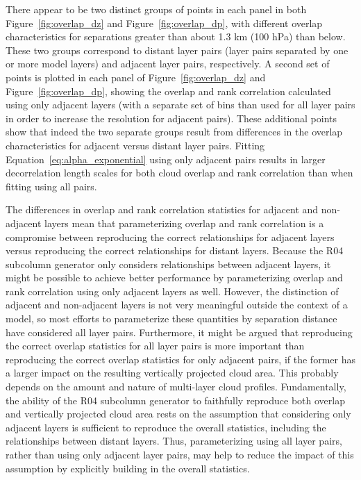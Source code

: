There appear to be two distinct groups of points in each panel in both
Figure~\ref{fig:overlap_dz} and Figure~\ref{fig:overlap_dp}, with
different overlap characteristics for separations greater than about 1.3
km (100 hPa) than below. These two groups correspond to distant layer
pairs (layer pairs separated by one or more model layers) and adjacent
layer pairs, respectively. A second set of points is plotted in each
panel of Figure~\ref{fig:overlap_dz} and Figure~\ref{fig:overlap_dp},
showing the overlap and rank correlation calculated using only adjacent
layers (with a separate set of bins than used for all layer pairs in
order to increase the resolution for adjacent pairs). These additional
points show that indeed the two separate groups result from differences
in the overlap characteristics for adjacent versus distant layer pairs.
Fitting Equation~\ref{eq:alpha_exponential} using only adjacent pairs
results in larger decorrelation length scales for both cloud overlap and
rank correlation than when fitting using all pairs.

The differences in overlap and rank correlation statistics for adjacent
and non-adjacent layers mean that parameterizing overlap and rank
correlation is a compromise between reproducing the correct
relationships for adjacent layers versus reproducing the correct
relationships for distant layers. Because the R04 subcolumn generator
only considers relationships between adjacent layers, it might be
possible to achieve better performance by parameterizing overlap and
rank correlation using only adjacent layers as well. However, the
distinction of adjacent and non-adjacent layers is not very meaningful
outside the context of a model, so most efforts to parameterize these
quantities by separation distance have considered all layer pairs.
Furthermore, it might be argued that reproducing the correct overlap
statistics for all layer pairs is more important than reproducing the
correct overlap statistics for only adjacent pairs, if the former has a
larger impact on the resulting vertically projected cloud area. This
probably depends on the amount and nature of multi-layer cloud profiles.
Fundamentally, the ability of the R04 subcolumn generator to faithfully
reproduce both overlap and vertically projected cloud area rests on the
assumption that considering only adjacent layers is sufficient to
reproduce the overall statistics, including the relationships between
distant layers. Thus, parameterizing using all layer pairs, rather than
using only adjacent layer pairs, may help to reduce the impact of this
assumption by explicitly building in the overall statistics.


